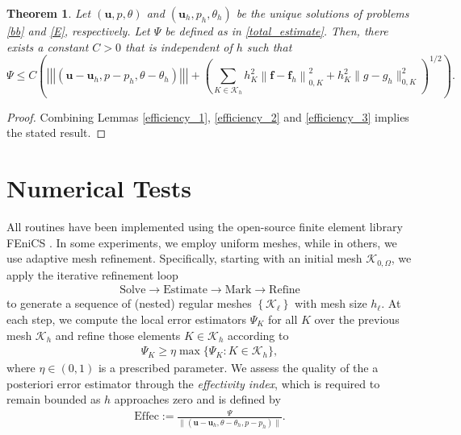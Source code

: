 \documentclass[10pt,a4paper]{article}
\newtheorem{theorem} {\bf Theorem}
\begin{document}
\begin{theorem}
  Let $(\boldsymbol{u}, p, \theta)$ and $\left(\boldsymbol{u}_h, p_h, \theta_h \right)$ be the unique solutions of problems \eqref{bb} and \eqref{E}, respectively. Let $\Psi$ be defined as in \eqref{total_estimate}. Then, there exists a constant $C>0$ that is independent of $h$ such that
$$
\Psi \leq C\left( \left|\!\left|\!\left| (\boldsymbol{u}-\boldsymbol{u}_h , p -p_h, \theta - \theta_h)\right|\!\right|\!\right|    +\left(\sum_{K \in \mathcal{K}_h} h_K^2\left\|\boldsymbol{f}-\boldsymbol{f}_h\right\|_{0, K}^2 +h_K^2 \|g-g_h\|^2_{0,K}\right)^{1 / 2}\right) .
$$
\end{theorem}
\begin{proof}
     Combining Lemmas \ref{efficiency_1}, \ref{efficiency_2} and \ref{efficiency_3} implies the stated result.
\end{proof}

\section{Numerical Tests}\label{section6}
All routines have been implemented using the open-source finite element library FEniCS \cite{alnaes2015fenics}. In some experiments, we employ uniform meshes, while in others, we use adaptive mesh refinement. Specifically, starting with an initial mesh $\mathcal{K}_{0,\Omega}$, we apply the iterative refinement loop
\begin{align*} 
\text{Solve} \rightarrow \text{Estimate} \rightarrow \text{Mark} \rightarrow \text{Refine} 
\end{align*}
to generate a sequence of (nested) regular meshes $\left\{\mathcal{K}_{\ell}\right\}$ with mesh size $h_{\ell}$. At each step, we compute the local error estimators $\Psi_{K}$ for all $K$ over the previous mesh $\mathcal{K}_h$ and refine those elements $K \in \mathcal{K}_h$ according to
\begin{align*} 
\Psi_{K} \geq \eta \max\{\Psi_{K} : K \in \mathcal{K}_h\}, 
\end{align*}
where $\eta \in (0, 1)$ is a prescribed parameter. We assess the quality of the a posteriori error estimator through the \textit{effectivity index}, which is required to remain bounded as $h$ approaches zero and is defined by
\begin{align*}
\mathrm{Effec} := \frac{\Psi}{\|(\boldsymbol{u} - \boldsymbol{u}_h, \theta - \theta_h, p - p_h)\|}. 
\end{align*}
\end{document}
